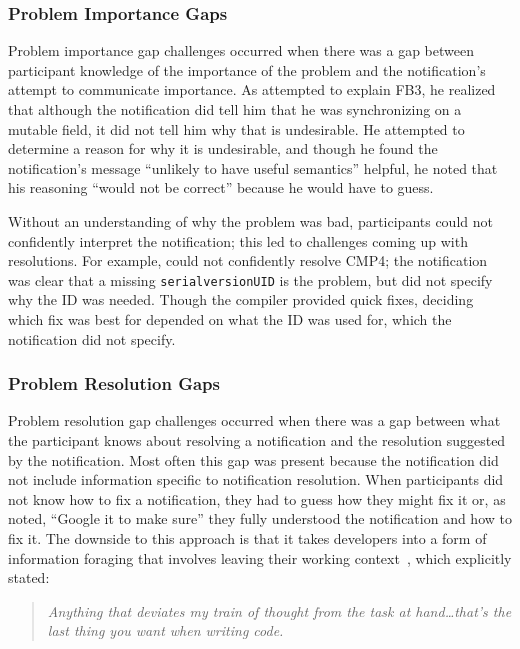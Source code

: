 \subsubsection{Problem Importance Gaps}\label{subsec:rationale}
Problem importance gap challenges occurred when there was a gap between participant knowledge of the importance of the problem and the notification's attempt to communicate importance.
As  attempted to explain FB3, he realized that although the notification did tell him that he was synchronizing on a mutable field, it did not tell him why that is undesirable. 
He attempted to determine a reason for why it is undesirable, and though he found the notification's message ``unlikely to have useful semantics'' helpful, he noted that his reasoning ``would not be correct'' because he would have to guess.

Without an understanding of why the problem was bad, participants could not confidently interpret the notification; this led to challenges coming up with resolutions. 
For example,  could not confidently resolve CMP4; the notification was clear that a missing \texttt{serialversionUID} is the problem, but did not specify why the ID was needed. 
Though the compiler provided quick fixes, deciding which fix was best for  depended on what the ID was used for, which the notification did not specify.

\subsubsection{Problem Resolution Gaps}\label{subsec:resolution}
Problem resolution gap challenges occurred when there was a gap between what the participant knows about resolving a notification and the resolution suggested by the notification. Most often this gap was present because the notification did not include information specific to notification resolution.
When participants did not know how to fix a notification, they had to guess how they might fix it or, as  noted, ``Google it to make sure'' they fully understood the notification and how to fix it. 
The downside to this approach is that it takes developers into a form of information foraging that involves leaving their working context~\cite{Altmann:2004:Task}, which  explicitly stated:

\begin{quote}
	\textit{Anything that deviates my train of thought from the task at hand\ldots that's the last thing you want when writing code.}
\end{quote}

